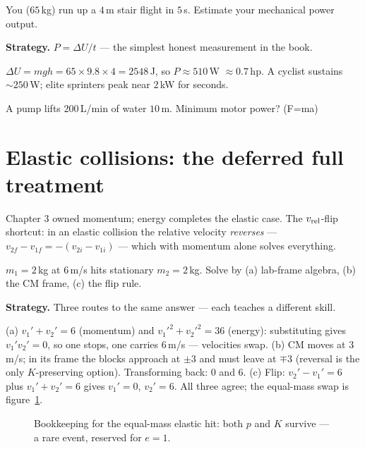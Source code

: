 \begin{example}\label{ex:stairs}
You ($65$\,kg) run up a $4$\,m stair flight in $5$\,s. Estimate your
mechanical power output.
\par\smallskip
\textbf{Strategy.} $P=\Delta U/t$ --- the simplest honest measurement in
the book.
\begin{solution}
$\Delta U=mgh=65\times9.8\times4=2548$\,J, so
$P\approx510$\,W $\approx0.7$\,hp. A cyclist sustains $\sim250$\,W; elite
sprinters peak near $2$\,kW for seconds. \checkmark
\end{solution}
\end{example}

\begin{exercise}[medium]
A pump lifts $200$\,L/min of water $10$\,m. Minimum motor power? (F=ma)
\end{exercise}

\section{Elastic collisions: the deferred full treatment}\label{sec:en-elastic}

Chapter 3 owned momentum; energy completes the elastic case. The
$v_{\rm rel}$-flip shortcut: in an elastic collision the relative velocity
\emph{reverses} --- $v_{2f}-v_{1f}=-(v_{2i}-v_{1i})$ --- which with
momentum alone solves everything.

\begin{example}\label{ex:elastic}
$m_1=2$\,kg at $6$\,m/s hits stationary $m_2=2$\,kg. Solve by (a)
lab-frame algebra, (b) the CM frame, (c) the flip rule.
\par\smallskip
\textbf{Strategy.} Three routes to the same answer --- each teaches a
different skill.
\begin{solution}
(a) $v_1'+v_2'=6$ (momentum) and $v_1'^{2}+v_2'^{2}=36$ (energy):
substituting gives $v_1'v_2'=0$, so one stops, one carries $6$\,m/s ---
velocities swap.
(b) CM moves at $3$\,m/s; in its frame the blocks approach at $\pm3$ and
must leave at $\mp3$ (reversal is the only $K$-preserving option).
Transforming back: $0$ and $6$.
(c) Flip: $v_2'-v_1'=6$ plus $v_1'+v_2'=6$ gives $v_1'=0$, $v_2'=6$.
All three agree; the equal-mass swap is figure~\ref{fig:pk}. \checkmark
\end{solution}
\end{example}

\begin{figure}[htbp]\centering

\caption{Bookkeeping for the equal-mass elastic hit: both $p$ and $K$
survive --- a rare event, reserved for $e=1$.}
\label{fig:pk}
\end{figure}

